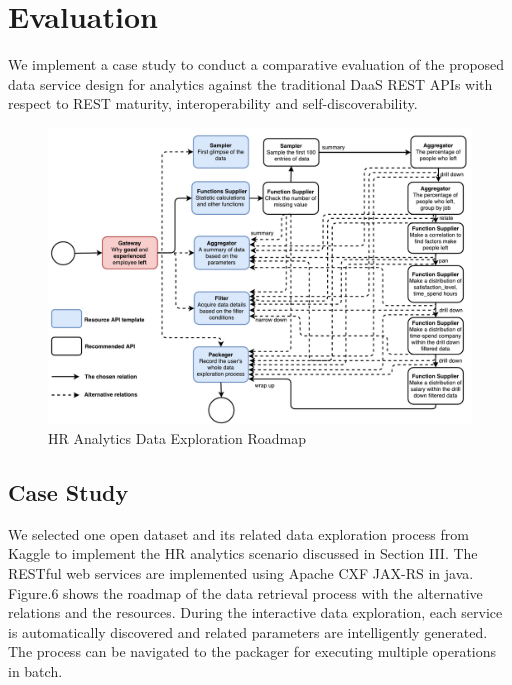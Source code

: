 \documentclass[10pt, conference, compsocconf]{IEEEtran}
\begin{document}
\section{Evaluation}
We implement a case study to conduct a comparative evaluation of the proposed data service design for analytics against the traditional DaaS REST APIs with respect to REST maturity, interoperability and self-discoverability. 
\begin{figure}[h]
	\centering
	\includegraphics[width=1.0\textwidth]{CaseStudy}
	\caption{HR Analytics Data Exploration Roadmap}
	\label{fig.6}
\end{figure}
\subsection{Case Study}
We selected one open dataset and its related data exploration process from Kaggle\cite{kaggle} to implement the HR analytics scenario discussed in Section III. 
The RESTful web services are implemented using Apache CXF JAX-RS in java. Figure.6 shows the roadmap of the data retrieval process with the alternative relations and the resources. During the interactive data exploration, each service is automatically discovered and related parameters are intelligently generated. The process can be navigated to the packager for executing multiple operations in batch. 
\end{document}
